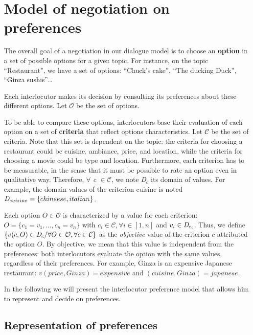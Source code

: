 \documentclass{llncs}
\begin{document}
\section{Model of negotiation on preferences}

\par The overall goal of a negotiation in our dialogue model is to choose an \textbf{option} in a set of possible options for a given topic. For instance, on the topic ``Restaurant'', we have a set of options: ``Chuck's cake'', ``The ducking Duck'', ``Ginza sushis''\ldots 
\par Each interlocutor makes its decision by consulting its preferences about these different options. Let $\mathcal{O}$ be the set of options.

To be able to compare these options, interlocutors base their evaluation of each option on a set of \textbf{criteria} that reflect options characteristics.
Let $\mathcal{C}$ be the set of criteria. 
Note that this set is dependent on the topic: the criteria for choosing a restaurant could be cuisine, ambiance, price, and location, while the criteria for choosing a movie could be type and location. 
Furthermore, each criterion has to be measurable, in the sense that it must be possible to rate an option even in qualitative way. Therefore, $\forall$ \emph{c $\in\mathcal{ C}$},  we note \emph{D$_c$} its  domain of values. For example, the domain  values of the criterion cuisine is noted $\emph{D}_{cuisine} = \{chineese, italian\}$.

Each option $O\in \mathcal{O}$ is characterized by a value for each criterion:
 $O = \{c_1=v_1,..., c_n=v_n\}$ with $c_i \in \mathcal{C}, \forall i \in [1,n]$ and $v_i\in \emph{D}_{c_i}$. 
 Thus, we define $\{v(c,O) \in \emph{D}_{c} / \forall O \in \mathcal{O}, \forall c \in \mathcal{C}\}$ as the \emph{objective} value of the criterion $c$ attributed  the option $O$. 
By objective, we mean that this value is independent from the preferences: both interlocutors evaluate the option with the same values, regardless of their preferences. 
For example, Ginza is an expensive Japanese restaurant: $v(price, Ginza) = expensive$ and $(cuisine, Ginza) = japanese$. 

In the following we will present the interlocutor preference model that allows him to represent and decide on preferences.

\subsection{Representation of preferences}
\end{document}
